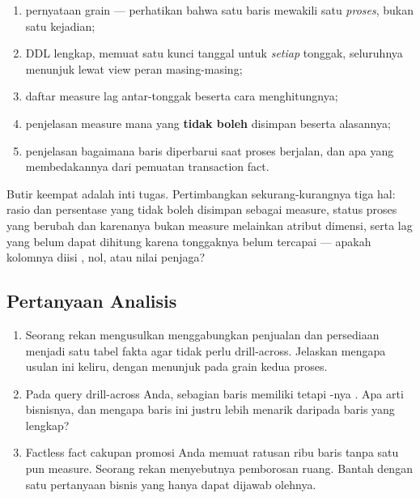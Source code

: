 \begin{enumerate}[leftmargin=1.4em]
  \item pernyataan grain --- perhatikan bahwa satu baris mewakili satu
        \emph{proses}, bukan satu kejadian;
  \item DDL lengkap, memuat satu kunci tanggal untuk \emph{setiap} tonggak,
        seluruhnya menunjuk  lewat view peran
        masing-masing;
  \item daftar measure lag antar-tonggak beserta cara menghitungnya;
  \item penjelasan measure mana yang \textbf{tidak boleh} disimpan beserta
        alasannya;
  \item penjelasan bagaimana baris diperbarui saat proses berjalan, dan apa
        yang membedakannya dari pemuatan transaction fact.
\end{enumerate}

\begin{catatan}
Butir keempat adalah inti tugas. Pertimbangkan sekurang-kurangnya tiga hal:
rasio dan persentase yang tidak boleh disimpan sebagai measure, status proses
yang berubah dan karenanya bukan measure melainkan atribut dimensi, serta lag
yang belum dapat dihitung karena tonggaknya belum tercapai --- apakah kolomnya
diisi , nol, atau nilai penjaga?
\end{catatan}

\subsection{Pertanyaan Analisis}

\begin{enumerate}[leftmargin=1.4em]
  \item Seorang rekan mengusulkan menggabungkan penjualan dan persediaan
        menjadi satu tabel fakta agar tidak perlu drill-across. Jelaskan
        mengapa usulan ini keliru, dengan menunjuk pada grain kedua proses.
  \item Pada query drill-across Anda, sebagian baris memiliki
         tetapi -nya
        . Apa arti bisnisnya, dan mengapa baris ini justru lebih
        menarik daripada baris yang lengkap?
  \item Factless fact cakupan promosi Anda memuat ratusan ribu baris tanpa satu
        pun measure. Seorang rekan menyebutnya pemborosan ruang. Bantah dengan
        satu pertanyaan bisnis yang hanya dapat dijawab olehnya.
\end{enumerate}

